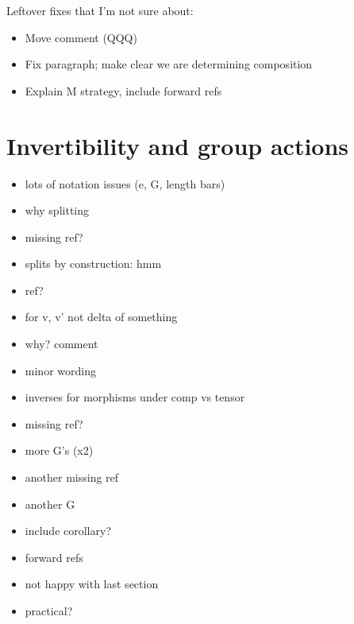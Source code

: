 \documentclass{amsart}
\begin{document}
Leftover fixes that I'm not sure about:
\begin{itemize}
\item Move comment (QQQ)
\item Fix paragraph; make clear we are determining composition
\item Explain M strategy, include forward refs
\end{itemize}

\section{ Invertibility and group actions}

\begin{itemize}


\item lots of notation issues (e, G, length bars)
\item why splitting
\item missing ref?
\item splits by construction: hmm
\item ref?
\item for v, v' not delta of something
\item why? comment
\item minor wording
\item inverses for morphisms under comp vs tensor
\item missing ref?
\item more G's (x2)
\item another missing ref
\item another G
\item include corollary?
\item forward refs
\item not happy with last section
\item practical?
\end{itemize}
\end{document}

